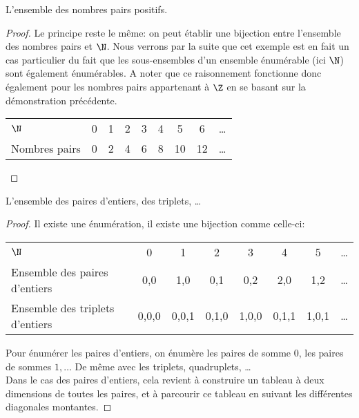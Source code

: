 \begin{myexem}
 L'ensemble des nombres pairs positifs.
  \begin{proof}
  Le principe reste le même: on peut établir une bijection entre l'ensemble des nombres pairs et $\N$. Nous verrons par la suite que cet exemple est en fait un cas particulier du fait que les sous-ensembles d'un ensemble énumérable (ici $\N$) sont également énumérables. A noter que ce raisonnement fonctionne donc également pour les nombres pairs appartenant à $\Z$ en se basant sur la démonstration précédente.

   \begin{tabular}{ l c c c c c c c r }
    $\N$ & 0 & 1 & 2  & 3 & 4 & 5 & 6 & \ldots \\
      Nombres pairs & 0 & 2 & 4 & 6 & 8 & 10 & 12  & \ldots \\
    \end{tabular}
  \end{proof}
\end{myexem}

\begin{myexem}
\label{exem:paire_entiers}
  L'ensemble des paires d'entiers, des triplets, \ldots
    \begin{proof}
        Il existe une énumération, il existe une bijection comme celle-ci:

		\begin{tabular}{ l c c  c  c c c  r }
			$\N$  & 0 & 1 & 2  & 3 & 4 & 5 & \ldots  \\
			Ensemble des paires d'entiers & {0,0} & {1,0} & {0,1} & {0,2} & {2,0} & {1,2}  & \ldots \\
			Ensemble des triplets d'entiers & {0,0,0} & {0,0,1} & {0,1,0} & {1,0,0} & {0,1,1} & {1,0,1}  & \ldots \\

		\end{tabular}

	Pour énumérer les paires d'entiers, on énumère les paires de somme 0, les paires de sommes $1, \ldots$ De même avec les triplets, quadruplets, \dots \\
	Dans le cas des paires d'entiers, cela revient à construire un tableau à deux dimensions de toutes les paires, et à parcourir ce tableau en suivant les différentes diagonales montantes.
    \end{proof}
\end{myexem}

